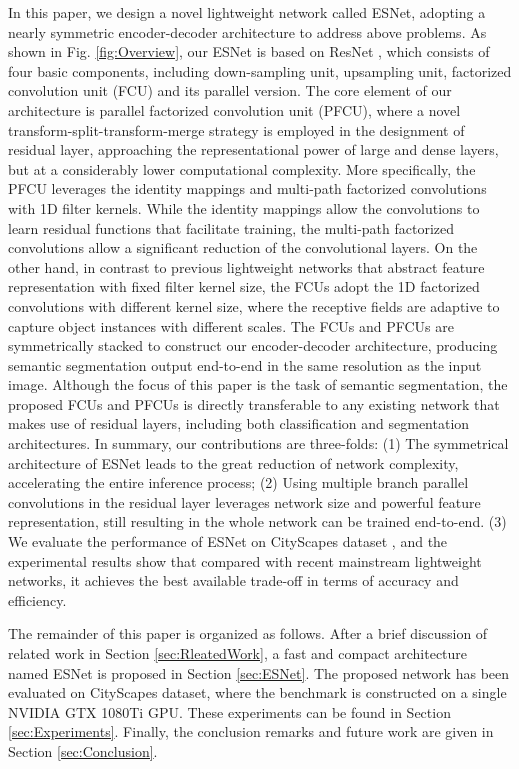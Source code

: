 \documentclass[runningheads]{llncs}
\begin{document}
In this paper, we design a novel lightweight network called ESNet, adopting a nearly symmetric encoder-decoder architecture to address above problems. As shown in Fig. \ref{fig:Overview}, our ESNet is based on ResNet \cite{he2016deep}, which consists of four basic components, including down-sampling unit, upsampling unit, factorized convolution unit (FCU) and its parallel version. The core element of our architecture is parallel factorized convolution unit (PFCU), where a novel transform-split-transform-merge strategy is employed in the designment of residual layer, approaching the representational power of large and dense layers, but at a considerably lower computational complexity. More specifically, the PFCU leverages the identity mappings and multi-path factorized convolutions with 1D filter kernels. While the identity mappings allow the convolutions to learn residual functions that facilitate training, the multi-path factorized convolutions allow a significant reduction of the convolutional layers. On the other hand, in contrast to previous lightweight networks \cite{Badrinarayanan2015Segnet,Paszke2016enet,Romera2018erfnet} that abstract feature representation with fixed filter kernel size, the FCUs adopt the 1D factorized convolutions with different kernel size, where the receptive fields are adaptive to capture object instances with different scales. The FCUs and PFCUs are symmetrically stacked to construct our encoder-decoder architecture, producing semantic segmentation output end-to-end in the same resolution as the input image. Although the focus of this paper is the task of semantic segmentation, the proposed FCUs and PFCUs is directly transferable to any existing network that makes use of residual layers, including both classification and segmentation architectures. In summary, our contributions are three-folds: (1) The symmetrical architecture of ESNet leads to the great reduction of network complexity, accelerating the entire inference process; (2) Using multiple branch parallel convolutions in the residual layer leverages network size and powerful feature representation, still resulting in the whole network can be trained end-to-end. (3) We evaluate the performance of ESNet on CityScapes dataset \cite{Cordts2016the}, and the experimental results show that compared with recent mainstream lightweight networks, it achieves the best available trade-off in terms of accuracy and efficiency.

The remainder of this paper is organized as follows. After a brief discussion of related work in Section \ref{sec:RleatedWork}, a fast and compact architecture named ESNet is proposed in Section \ref{sec:ESNet}. The proposed network has been evaluated on CityScapes dataset, where the benchmark is constructed on a single NVIDIA GTX 1080Ti GPU. These experiments can be found in Section \ref{sec:Experiments}. Finally, the conclusion  remarks and future work are given in Section \ref{sec:Conclusion}.
\end{document}
